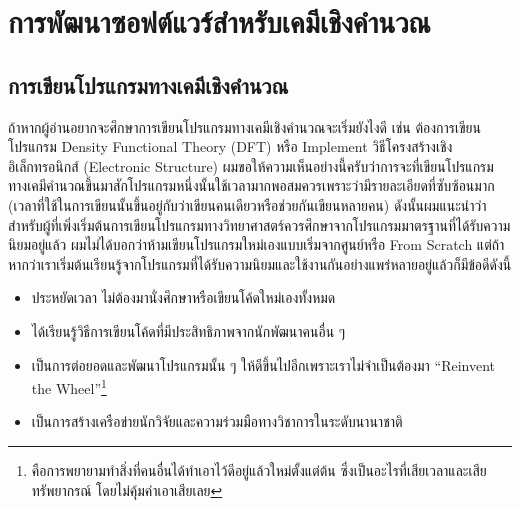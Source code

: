 

\chapter{การพัฒนาซอฟต์แวร์สำหรับเคมีเชิงคำนวณ}
\label{ch:software_dev}

\section{การเขียนโปรแกรมทางเคมีเชิงคำนวณ}

ถ้าหากผู้อ่านอยากจะศึกษาการเขียนโปรแกรมทางเคมีเชิงคำนวณจะเริ่มยังไงดี เช่น ต้องการเขียนโปรแกรม Density Functional Theory (DFT) หรือ Implement วิธีโครงสร้างเชิงอิเล็กทรอนิกส์ (Electronic Structure) ผมขอให้ความเห็นอย่างนี้ครับว่าการจะที่เขียนโปรแกรมทางเคมีคำนวณขึ้นมาสักโปรแกรมหนึ่งนั้นใช้เวลามากพอสมควรเพราะว่ามีรายละเอียดที่ซับซ้อนมาก (เวลาที่ใช้ในการเขียนนั้นขึ้นอยู่กับว่าเขียนคนเดียวหรือช่วยกันเขียนหลายคน) ดังนั้นผมแนะนำว่าสำหรับผู้ที่เพิ่งเริ่มต้นการเขียนโปรแกรมทางวิทยาศาสตร์ควรศึกษาจากโปรแกรมมาตรฐานที่ได้รับความนิยมอยู่แล้ว ผมไม่ได้บอกว่าห้ามเขียนโปรแกรมใหม่เองแบบเริ่มจากศูนย์หรือ From Scratch แต่ถ้าหากว่าเราเริ่มต้นเรียนรู้จากโปรแกรมที่ได้รับความนิยมและใช้งานกันอย่างแพร่หลายอยู่แล้วก็มีข้อดีดังนี้
%
\begin{itemize}[topsep=0pt]
  \setlength\itemsep{0.5em}
  \item ประหยัดเวลา ไม่ต้องมานั่งศึกษาหรือเขียนโค้ดใหม่เองทั้งหมด

  \item ได้เรียนรู้วิธีการเขียนโค้ดที่มีประสิทธิภาพจากนักพัฒนาคนอื่น ๆ

  \item เป็นการต่อยอดและพัฒนาโปรแกรมนั้น ๆ ให้ดีขึ้นไปอีกเพราะเราไม่จำเป็นต้องมา \enquote{Reinvent the Wheel}\footnote{คือการพยายามทำสิ่งที่คนอื่นได้ทำเอาไว้ดีอยู่แล้วใหม่ตั้งแต่ต้น ซึ่งเป็นอะไรที่เสียเวลาและเสียทรัพยากรณ์ โดยไม่คุ้มค่าเอาเสียเลย}

  \item เป็นการสร้างเครือข่ายนักวิจัยและความร่วมมือทางวิชาการในระดับนานาชาติ
\end{itemize}

